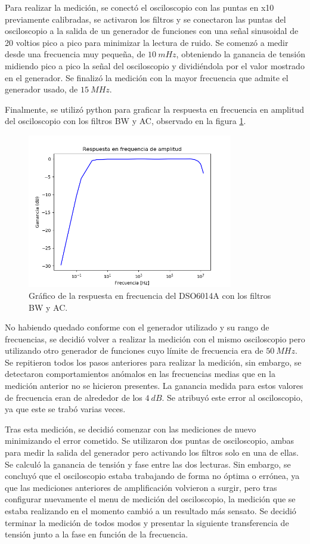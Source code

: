 \documentclass[11pt, a4paper]{article}
\begin{document}
Para realizar la medición, se conectó el osciloscopio con las puntas en x10 previamente calibradas, se activaron los filtros y se conectaron las puntas del osciloscopio a la salida de un generador de funciones con una señal sinusoidal de 20 voltios pico a pico para minimizar la lectura de ruido. Se comenzó a medir desde una frecuencia muy pequeña, de $10 \ mHz$, obteniendo la ganancia de tensión midiendo pico a pico la señal del osciloscopio y dividiéndola por el valor mostrado en el generador. Se finalizó la medición con la mayor frecuencia que admite el generador usado, de $15 \ MHz$.

Finalmente, se utilizó python para graficar la respuesta en frecuencia en amplitud del osciloscopio con los filtros BW y AC, observado en la figura \ref{graf:resp_freq_osci}.

\begin{figure}[H]
	\centering
	\includegraphics[width=0.8\textwidth]{resp_freq_osci.png}
	\caption{Gráfico de la respuesta en frecuencia del DSO6014A con los filtros BW y AC.} 
	\label{graf:resp_freq_osci}
\end{figure}

No habiendo quedado conforme con el generador utilizado y su rango de frecuencias, se decidió volver a realizar la medición con el mismo osciloscopio pero utilizando otro generador de funciones cuyo límite de frecuencia era de $50 \ MHz$. Se repitieron todos los pasos anteriores para realizar la medición, sin embargo, se detectaron comportamientos anómalos en las frecuencias medias que en la medición anterior no se hicieron presentes. La ganancia medida para estos valores de frecuencia eran de alrededor de los $4 \ dB$. Se atribuyó este error al osciloscopio, ya que este se trabó varias veces.

Tras esta medición, se decidió comenzar con las mediciones de nuevo minimizando el error cometido. Se utilizaron dos puntas de osciloscopio, ambas para medir la salida del generador pero activando los filtros solo en una de ellas. Se calculó la ganancia de tensión y fase entre las dos lecturas. Sin embargo, se concluyó que el osciloscopio estaba trabajando de forma no óptima o errónea, ya que las mediciones anteriores de amplificación volvieron a surgir, pero tras configurar nuevamente el menu de medición del osciloscopio, la medición que se estaba realizando en el momento cambió a un resultado más sensato. Se decidió terminar la medición de todos modos y presentar la siguiente transferencia de tensión junto a la fase en función de la frecuencia.
\end{document}

